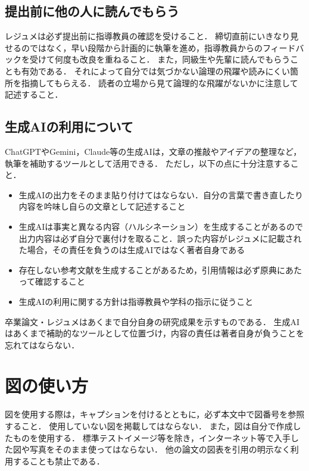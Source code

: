 \subsection{提出前に他の人に読んでもらう}
\label{subsec:review}
レジュメは必ず提出前に指導教員の確認を受けること．
締切直前にいきなり見せるのではなく，早い段階から計画的に執筆を進め，指導教員からのフィードバックを受けて何度も改良を重ねること．
また，同級生や先輩に読んでもらうことも有効である．
それによって自分では気づかない論理の飛躍や読みにくい箇所を指摘してもらえる．
読者の立場から見て論理的な飛躍がないかに注意して記述すること．

\subsection{生成AIの利用について}
\label{subsec:ai}
ChatGPTやGemini，Claude等の生成AIは，文章の推敲やアイデアの整理など，執筆を補助するツールとして活用できる．
ただし，以下の点に十分注意すること．
\begin{itemize}
    \item 生成AIの出力をそのまま貼り付けてはならない．自分の言葉で書き直したり内容を吟味し自らの文章として記述すること
    \item 生成AIは事実と異なる内容（ハルシネーション）を生成することがあるので出力内容は必ず自分で裏付けを取ること．誤った内容がレジュメに記載された場合，その責任を負うのは生成AIではなく著者自身である
    \item 存在しない参考文献を生成することがあるため，引用情報は必ず原典にあたって確認すること
    \item 生成AIの利用に関する方針は指導教員や学科の指示に従うこと
\end{itemize}
卒業論文・レジュメはあくまで自分自身の研究成果を示すものである．
生成AIはあくまで補助的なツールとして位置づけ，内容の責任は著者自身が負うことを忘れてはならない．

\section{図の使い方}
\label{sec:figure}

図を使用する際は，キャプションを付けるとともに，必ず本文中で図番号を参照すること．
使用していない図を掲載してはならない．
また，図は自分で作成したものを使用する．
標準テストイメージ等を除き，インターネット等で入手した図や写真をそのまま使ってはならない．
他の論文の図表を引用の明示なく利用することも禁止である．

